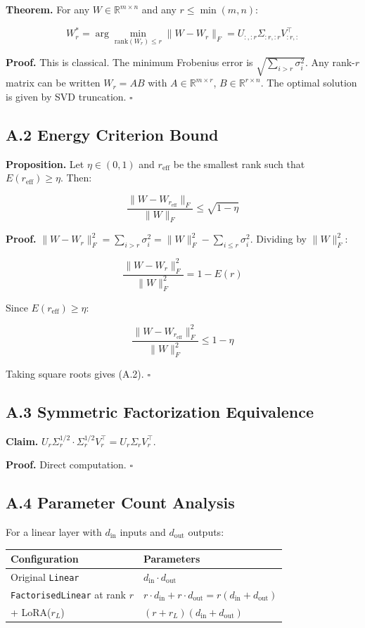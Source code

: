 \textbf{Theorem.} For any $W \in \mathbb{R}^{m \times n}$ and any $r \leq \min(m, n)$:

\[
W_r^* = \arg\min_{\text{rank}(W_r) \leq r} \|W - W_r\|_F = U_{:, :r} \Sigma_{:r, :r} V_{:r, :}^\top
\tag{A.1}
\]

\textbf{Proof.} This is classical. The minimum Frobenius error is 
$\sqrt{\sum_{i > r} \sigma_i^2}$. Any rank-$r$ matrix can be written 
$W_r = A B$ with $A \in \mathbb{R}^{m \times r}$, $B \in \mathbb{R}^{r \times n}$. 
The optimal solution is given by SVD truncation. $\square$

\subsection{A.2 Energy Criterion Bound}

\textbf{Proposition.} Let $\eta \in (0, 1)$ and $r_\text{eff}$ be the smallest 
rank such that $E(r_\text{eff}) \geq \eta$. Then:

\[
\frac{\|W - W_{r_\text{eff}}\|_F}{\|W\|_F} \leq \sqrt{1 - \eta}
\tag{A.2}
\]

\textbf{Proof.} $\|W - W_r\|_F^2 = \sum_{i > r} \sigma_i^2 = \|W\|_F^2 - \sum_{i \leq r} \sigma_i^2$. 
Dividing by $\|W\|_F^2$:

\[
\frac{\|W - W_r\|_F^2}{\|W\|_F^2} = 1 - E(r)
\tag{A.3}
\]

Since $E(r_\text{eff}) \geq \eta$:

\[
\frac{\|W - W_{r_\text{eff}}\|_F^2}{\|W\|_F^2} \leq 1 - \eta
\tag{A.4}
\]

Taking square roots gives (A.2). $\square$

\subsection{A.3 Symmetric Factorization Equivalence}

\textbf{Claim.} $U_r \Sigma_r^{1/2} \cdot \Sigma_r^{1/2} V_r^\top = U_r \Sigma_r V_r^\top$.

\textbf{Proof.} Direct computation. $\square$

\subsection{A.4 Parameter Count Analysis}

For a linear layer with $d_\text{in}$ inputs and $d_\text{out}$ outputs:

\begin{table}[H]
\centering
\small
\begin{tabular}{ll}
\toprule
\textbf{Configuration} & \textbf{Parameters} \\
\midrule
Original \texttt{Linear} & $d_\text{in} \cdot d_\text{out}$ \\
\texttt{FactorisedLinear} at rank $r$ & $r \cdot d_\text{in} + r \cdot d_\text{out} = r(d_\text{in} + d_\text{out})$ \\
+ LoRA($r_L$) & $(r + r_L)(d_\text{in} + d_\text{out})$ \\
\bottomrule
\end{tabular}
\end{table}

